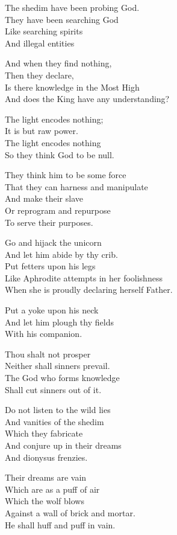 \documentclass[
]{book}
\begin{document}
The shedim have been probing God.\\
They have been searching God\\
Like searching spirits\\
And illegal entities

And when they find nothing,\\
Then they declare,\\
Is there knowledge in the Most High\\
And does the King have any understanding?

The light encodes nothing;\\
It is but raw power.\\
The light encodes nothing\\
So they think God to be null.

They think him to be some force\\
That they can harness and manipulate\\
And make their slave\\
Or reprogram and repurpose\\
To serve their purposes.

Go and hijack the unicorn\\
And let him abide by thy crib.\\
Put fetters upon his legs\\
Like Aphrodite attempts in her foolishness\\
When she is proudly declaring herself Father.

Put a yoke upon his neck\\
And let him plough thy fields\\
With his companion.

Thou shalt not prosper\\
Neither shall sinners prevail.\\
The God who forms knowledge\\
Shall cut sinners out of it.

Do not listen to the wild lies\\
And vanities of the shedim\\
Which they fabricate\\
And conjure up in their dreams\\
And dionysus frenzies.

Their dreams are vain\\
Which are as a puff of air\\
Which the wolf blows\\
Against a wall of brick and mortar.\\
He shall huff and puff in vain.
\end{document}
